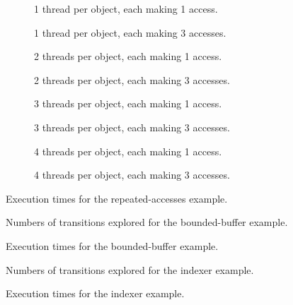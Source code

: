 \documentclass[12pt,a4paper,twoside,openany]{report}
\newenvironment{figtile} %
{\begin{subfigure}{0.48\textwidth}
		\def\svgwidth{\textwidth}
		\captionsetup{font=footnotesize}
	}
	{\end{subfigure}}
\begin{document}
\begin{figure}
	\centering
	\footnotesize
	\begin{figtile}
		
		\caption{1 thread per object,
			each making 1 access.}
	\end{figtile}%
	\quad
	\begin{figtile}
		
		\caption{1 thread per object,
			each making 3 accesses.}
	\end{figtile}
	\begin{figtile}
		
		\caption{2 threads per object,
			each making 1 access.}
	\end{figtile}%
	\quad
	\begin{figtile}
		
		\caption{2 threads per object,
			each making 3 accesses.}
	\end{figtile}
	\begin{figtile}
		
		\caption{3 threads per object,
			each making 1 access.}
	\end{figtile}%
	\quad
	\begin{figtile}
		
		\caption{3 threads per object,
			each making 3 accesses.}
	\end{figtile}
	\begin{figtile}
		
		\caption{4 threads per object,
			each making 1 access.}
	\end{figtile}%
	\quad
	\begin{figtile}
		
		\caption{4 threads per object,
			each making 3 accesses.}
		\label{fig:repeated-access-time-h}
	\end{figtile}
	\caption{Execution times for the repeated-accesses example.}
	\label{fig:repeated-access-time}
\end{figure}

\begin{figure}
	\centering

	\def\svgwidth{\textwidth}
	
	\caption{Numbers of transitions explored
		for the bounded-buffer example.}
	\label{fig:prod-cons-trans}
	\def\svgwidth{\textwidth}
	
	\caption{Execution times for the
		bounded-buffer example.}
	\label{fig:prod-cons-time}
\end{figure}

\begin{figure}
	\centering

	\def\svgwidth{\textwidth}
	
	\caption{Numbers of transitions explored
		for the indexer example.}
	\label{fig:indexer-trans}

	\def\svgwidth{\textwidth}
	
	\caption{Execution times
		for the indexer example.}
	\label{fig:indexer-time}
\end{figure}
\end{document}
